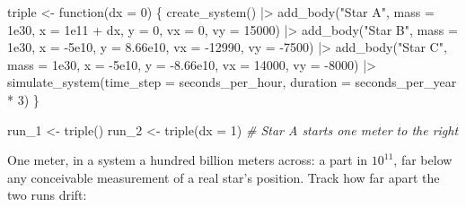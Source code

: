 \documentclass[
  10.5pt,
  letterpaper,
]{scrbook}
\newenvironment{Shaded}{\begin{snugshade}}{\end{snugshade}}
\newcommand{\AttributeTok}[1]{\textcolor[rgb]{0.00,0.00,0.00}{#1}}
\newcommand{\CommentTok}[1]{\textcolor[rgb]{0.00,0.00,0.00}{\textit{#1}}}
\newcommand{\ControlFlowTok}[1]{\textcolor[rgb]{0.00,0.00,0.00}{#1}}
\newcommand{\DecValTok}[1]{\textcolor[rgb]{0.00,0.00,0.00}{#1}}
\newcommand{\FloatTok}[1]{\textcolor[rgb]{0.00,0.00,0.00}{#1}}
\newcommand{\FunctionTok}[1]{\textcolor[rgb]{0.00,0.00,0.00}{#1}}
\newcommand{\NormalTok}[1]{\textcolor[rgb]{0.00,0.00,0.00}{#1}}
\newcommand{\OtherTok}[1]{\textcolor[rgb]{0.00,0.00,0.00}{#1}}
\newcommand{\SpecialCharTok}[1]{\textcolor[rgb]{0.00,0.00,0.00}{#1}}
\newcommand{\StringTok}[1]{\textcolor[rgb]{0.00,0.00,0.00}{#1}}
\theoremstyle{plain}
\theoremstyle{remark}
\begin{document}
\begin{Shaded}
\begin{Highlighting}[]
\NormalTok{triple }\OtherTok{\textless{}{-}} \ControlFlowTok{function}\NormalTok{(}\AttributeTok{dx =} \DecValTok{0}\NormalTok{) \{}
  \FunctionTok{create\_system}\NormalTok{() }\SpecialCharTok{|\textgreater{}}
    \FunctionTok{add\_body}\NormalTok{(}\StringTok{"Star A"}\NormalTok{, }\AttributeTok{mass =} \FloatTok{1e30}\NormalTok{, }\AttributeTok{x =} \FloatTok{1e11} \SpecialCharTok{+}\NormalTok{ dx, }\AttributeTok{y =} \DecValTok{0}\NormalTok{,}
             \AttributeTok{vx =} \DecValTok{0}\NormalTok{, }\AttributeTok{vy =} \DecValTok{15000}\NormalTok{) }\SpecialCharTok{|\textgreater{}}
    \FunctionTok{add\_body}\NormalTok{(}\StringTok{"Star B"}\NormalTok{, }\AttributeTok{mass =} \FloatTok{1e30}\NormalTok{, }\AttributeTok{x =} \SpecialCharTok{{-}}\FloatTok{5e10}\NormalTok{, }\AttributeTok{y =} \FloatTok{8.66e10}\NormalTok{,}
             \AttributeTok{vx =} \SpecialCharTok{{-}}\DecValTok{12990}\NormalTok{, }\AttributeTok{vy =} \SpecialCharTok{{-}}\DecValTok{7500}\NormalTok{) }\SpecialCharTok{|\textgreater{}}
    \FunctionTok{add\_body}\NormalTok{(}\StringTok{"Star C"}\NormalTok{, }\AttributeTok{mass =} \FloatTok{1e30}\NormalTok{, }\AttributeTok{x =} \SpecialCharTok{{-}}\FloatTok{5e10}\NormalTok{, }\AttributeTok{y =} \SpecialCharTok{{-}}\FloatTok{8.66e10}\NormalTok{,}
             \AttributeTok{vx =} \DecValTok{14000}\NormalTok{, }\AttributeTok{vy =} \SpecialCharTok{{-}}\DecValTok{8000}\NormalTok{) }\SpecialCharTok{|\textgreater{}}
    \FunctionTok{simulate\_system}\NormalTok{(}\AttributeTok{time\_step =}\NormalTok{ seconds\_per\_hour, }\AttributeTok{duration =}\NormalTok{ seconds\_per\_year }\SpecialCharTok{*} \DecValTok{3}\NormalTok{)}
\NormalTok{\}}

\NormalTok{run\_1 }\OtherTok{\textless{}{-}} \FunctionTok{triple}\NormalTok{()}
\NormalTok{run\_2 }\OtherTok{\textless{}{-}} \FunctionTok{triple}\NormalTok{(}\AttributeTok{dx =} \DecValTok{1}\NormalTok{)      }\CommentTok{\# Star A starts one meter to the right}
\end{Highlighting}
\end{Shaded}

One meter, in a system a hundred billion meters across: a part in
\(10^{11}\), far below any conceivable measurement of a real star's
position. Track how far apart the two runs drift:
\end{document}

